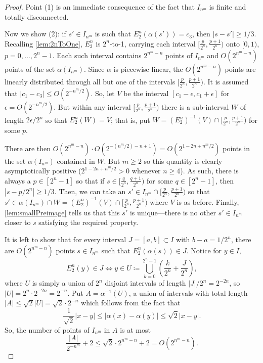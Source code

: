 \documentclass{amsart}
\theoremstyle{theorem}
\theoremstyle{remark}
\begin{document}
\begin{proof}
Point (1) is an immediate consequence of the fact that $I_{n^m}$ is finite and totally disconnected.

Now we show (2): if $s' \in I_{n^m}$ is such that $E^n_2(\alpha(s')) =c_3$, then $|s-s'|\geq 1/3$.
Recalling \cref{lem:2nToOne}, $E_2^n$ is $2^n$-to-1, carrying each interval $[\frac{p}{2^n}, \frac{p+1}{2^n})$ onto $[0,1)$, $p=0,\dots,2^n-1$. Each such interval contains $2^{n^m-n}$ points of $I_{n^m}$ and $O(2^{n^m-n})$ points of the set $\alpha(I_{n^m})$. Since $\alpha$ is piecewise linear, the $O(2^{n^m-n})$ points are linearly distributed through all but one of the intervals $[\frac{p}{2^n}, \frac{p+1}{2^n})$.
It is assumed that $|c_1-c_3|\leq O(2^{-n^m/2})$. So, let $V$ be the interval $[c_1-\epsilon, c_1+\epsilon]$ for $\epsilon = O(2^{-n^m/2})$. But within any interval $[\frac{p}{2^n}, \frac{p+1}{2^n})$ there is a sub-interval $W$ of length $2\epsilon/2^n$ so that $E_2^n(W) = V$; that is, put $W = (E^n_2)^{-1}(V) \cap [\frac{p}{2^n}, \frac{p+1}{2^n})$ for some $p$.

There are then $O(2^{n^m-n})\cdot O(2^{-(n^m/2)-n+1}) = O(2^{1-2n + n^m/2})$ points in the set $\alpha(I_{n^m})$ contained in $W$. But $m\geq 2$ so this quantity is clearly asymptotically positive ($2^{1-2n + n^m/2}>0$ whenever $n\geq 4$). 
As such, there is always a $p \in [2^n-1]$ so that if $s \in [\frac{q}{2^n}, \frac{q+1}{2^n})$ for some $q\in [2^n-1]$, then $|s-p/2^n|\geq 1/3$. Then, we can take an $s' \in I_{n^m}\cap [\frac{p}{2^n}, \frac{p+1}{2^n})$ so that $s'\in \alpha(I_{n^m}) \cap W= (E^n_2)^{-1}(V) \cap [\frac{p}{2^n}, \frac{p+1}{2^n})$ where $V$ is as before. Finally, \cref{lem:smallPreimage} tells us that this $s'$ is unique---there is no other $s' \in I_{n^m}$ closer to $s$ satisfying the required property.

It is left to show that for every interval $J = [a, b] \subset I$ with $b-a = 1/2^n$, there are $O(2^{n^m-n})$ points $s \in I_{n^m}$ such that $E_2^n(\alpha(s)) \in J$.
Notice for $y \in I$,
\[
E_2^n(y) \in J \iff y \in U \coloneqq \bigcup_{k=0}^{2^n-1}\left(\frac{k}{2^n} + \frac{J}{2^n}\right),
\]
where $U$ is simply a union of $2^n$ disjoint intervals of length $|J|/2^n = 2^{-2n}$, so $|U|=2^n\cdot2^{-2n}=2^{-n}$. Put $A = \alpha^{-1}(U)$, a union of intervals with total length $|A|\leq \sqrt{2}|U| = \sqrt{2}\cdot2^{-n}$ which follows from the fact that
\[
\frac{1}{\sqrt{2}}|x-y| \leq |\alpha(x) - \alpha(y)|\leq \sqrt{2}|x-y|.
\]
So, the number of points of $I_{n^m}$ in $A$ is at most
\[
\frac{|A|}{2^{-n^m}} + 2 \leq \sqrt{2}\cdot 2^{n^m-n} + 2 = O\left(2^{n^m-n}\right).
\]
\end{proof}
\end{document}
